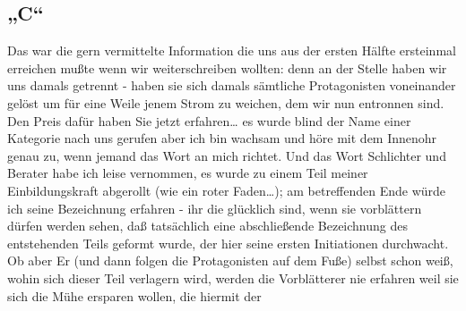 \documentclass[
]{article}
\author{}
\date{\vspace{-2.5em}}
\begin{document}
\subsection{„C``}\label{c}

Das war die gern vermittelte Information die uns aus der ersten Hälfte
ersteinmal erreichen mußte wenn wir weiterschreiben wollten: denn an der
Stelle haben wir uns damals getrennt - haben sie sich damals sämtliche
Protagonisten voneinander gelöst um für eine Weile jenem Strom zu
weichen, dem wir nun entronnen sind. Den Preis dafür haben Sie jetzt
erfahren\ldots{} es wurde blind der Name einer Kategorie nach uns
gerufen aber ich bin wachsam und höre mit dem Innenohr genau zu, wenn
jemand das Wort an mich richtet. Und das Wort Schlichter und Berater
habe ich leise vernommen, es wurde zu einem Teil meiner Einbildungskraft
abgerollt (wie ein roter Faden\ldots); am betreffenden Ende würde ich
seine Bezeichnung erfahren - ihr die glücklich sind, wenn sie
vorblättern dürfen werden sehen, daß tatsächlich eine abschließende
Bezeichnung des entstehenden Teils geformt wurde, der hier seine ersten
Initiationen durchwacht. Ob aber Er (und dann folgen die Protagonisten
auf dem Fuße) selbst schon weiß, wohin sich dieser Teil verlagern wird,
werden die Vorblätterer nie erfahren weil sie sich die Mühe ersparen
wollen, die hiermit der
\end{document}

